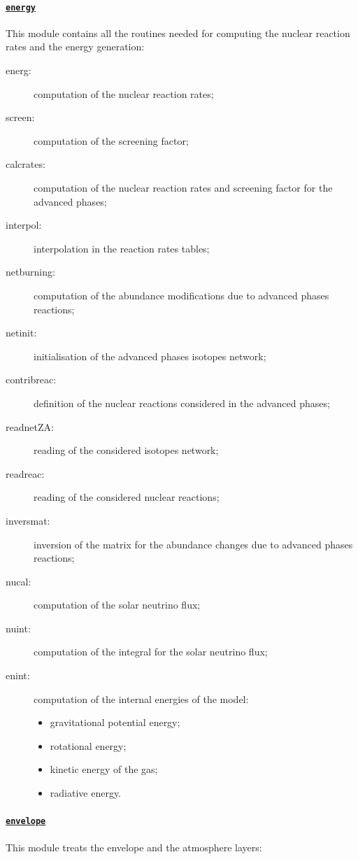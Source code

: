 \documentclass[11pt]{article}
\begin{document}
\paragraph{\underline{\texttt{energy}}}
This module contains all the routines needed for computing the nuclear reaction rates and the energy generation:

\begin{description}
 \item[energ:] computation of the nuclear reaction rates;
 \item[screen:] computation of the screening factor;
 \item[calcrates:] computation of the nuclear reaction rates and screening factor for the advanced phases;
 \item[interpol:] interpolation in the reaction rates tables;
 \item[netburning:] computation of the abundance modifications due to advanced phases reactions;
 \item[netinit:] initialisation of the advanced phases isotopes network;
 \item[contribreac:] definition of the nuclear reactions considered in the advanced phases;
 \item[readnetZA:] reading of the considered isotopes network;
 \item[readreac:] reading of the considered nuclear reactions;
 \item[inversmat:] inversion of the matrix for the abundance changes due to advanced phases reactions;
 \item[nucal:] computation of the solar neutrino flux;
 \item[nuint:] computation of the integral for the solar neutrino flux;
 \item[enint:] computation of the internal energies of the model:
   \begin{itemize}
     \item gravitational potential energy;
     \item rotational energy;
     \item kinetic energy of the gas;
     \item radiative energy.
   \end{itemize}
 \end{description}

\paragraph{\underline{\texttt{envelope}}}
This module treats the envelope and the atmosphere layers:
\end{document}
